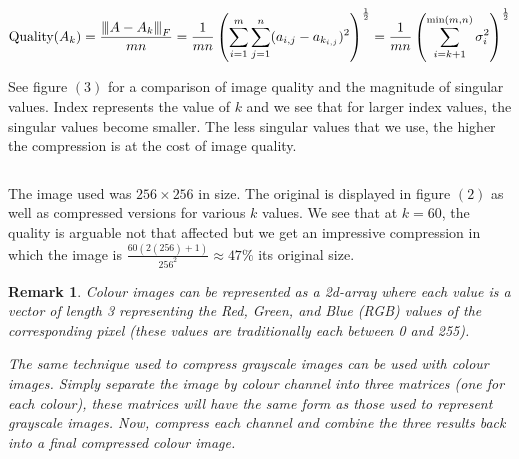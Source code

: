 \documentclass[a4paper]{article}
\newcommand{\norm}[1]{{\left\vert\kern-0.25ex\left\vert\kern-0.25ex\left\vert #1 
    \right\vert\kern-0.25ex\right\vert\kern-0.25ex\right\vert}}
\newtheorem{remark}[theorem]{Remark}
\begin{document}
$$
\text{Quality}(A_k)
= \frac{\norm{A-A_k}_F}{mn}
= \frac{1}{mn} \left( \sum_{i=1}^m \sum_{j=1}^n (a_{i,j} - a_{k_{i,j}})^2 \right)^\frac{1}{2}
= \frac{1}{mn} \left( \sum_{i=k+1}^{\min(m,n)} \sigma_i^2 \right) ^\frac{1}{2}
$$

See figure $(3)$ for a comparison of image quality and the magnitude of singular values.  Index represents the value of $k$ and we see that for larger index values, the singular values become smaller.  The less singular values that we use, the higher the compression is at the cost of image quality.

$$
$$

The image used was $256\times 256$ in size.  The original is displayed in figure $(2)$ as well as compressed versions for various $k$ values.  We see that at $k=60$, the quality is arguable not that affected but we get an impressive compression in which the image is $\frac{60(2(256)+1)}{256^2} \approx 47\%$ its original size.


\begin{remark}
Colour images can be represented as a 2d-array where each value is a vector of length 3 representing the Red, Green, and Blue (RGB) values of the corresponding pixel (these values are traditionally  each between 0 and 255).

The same technique used to compress grayscale images can be used with colour images.  Simply separate the image by colour channel into three matrices (one for each colour), these matrices will have the same form as those used to represent grayscale images.  Now, compress each channel and combine the three results back into a final compressed colour image.
\end{remark}





\pagebreak


\end{document}
